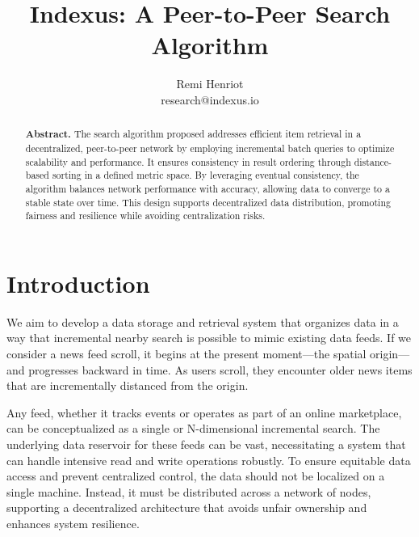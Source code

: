 \documentclass[11pt]{article}
\begin{document}
\title{Indexus: A Peer-to-Peer Search Algorithm}
\author{Remi Henriot  \\
        research@indexus.io }
\date{}

\maketitle

\begin{abstract}
\noindent \textbf{Abstract. }The search algorithm proposed addresses efficient item retrieval in a decentralized, peer-to-peer network by employing incremental batch queries to optimize scalability and performance. It ensures consistency in result ordering through distance-based sorting in a defined metric space. By leveraging eventual consistency, the algorithm balances network performance with accuracy, allowing data to converge to a stable state over time. This design supports decentralized data distribution, promoting fairness and resilience while avoiding centralization risks.
\vspace{1em}\end{abstract}

\section*{Introduction}
We aim to develop a data storage and retrieval system that organizes data in a way that incremental nearby search is possible to mimic existing data feeds. 
If we consider a news feed scroll, it begins at the present moment—the spatial origin—and progresses backward in time. As users scroll, they encounter older news items that are incrementally distanced from the origin.

\vspace{1em}

Any feed, whether it tracks events or operates as part of an online marketplace, can be conceptualized as a single or N-dimensional incremental search. The underlying data reservoir for these feeds can be vast, necessitating a system that can handle intensive read and write operations robustly. To ensure equitable data access and prevent centralized control, the data should not be localized on a single machine. Instead, it must be distributed across a network of nodes, supporting a decentralized architecture that avoids unfair ownership and enhances system resilience.

\vspace{1em}
\end{document}

